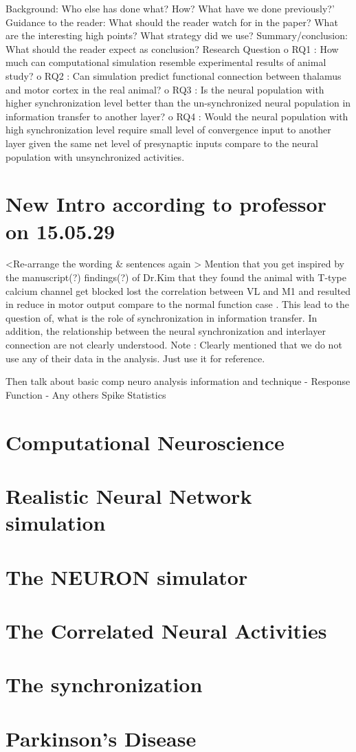 Background: Who else has done what? How? What have we done previously?’
Guidance to the reader: What should the reader watch for in the paper? What are the interesting high points? What strategy did we use?
Summary/conclusion: What should the reader expect as conclusion?
Research Question
o RQ1 : How much can computational simulation resemble experimental results of animal study?
o RQ2 : Can simulation predict functional connection between thalamus and motor cortex in the real animal?
o	RQ3 : Is the neural population with higher synchronization level better than the un-synchronized neural population in information transfer to another layer? 
o	RQ4 : Would the  neural population with high synchronization level  require small level of convergence input to another layer given the same net level of presynaptic inputs compare to the neural population with unsynchronized activities.

\section{New Intro according to professor on 15.05.29}
<Re-arrange the wording \& sentences again >
Mention that you get inspired by the manuscript(?) findings(?) of Dr.Kim that they found the animal with T-type calcium channel get blocked lost the correlation between VL and M1 and resulted in reduce in motor output
compare to the normal function case . This lead to the question of, what is the role of synchronization in information transfer.  In addition, the relationship between the neural synchronization and interlayer connection are not clearly understood. 
Note : Clearly mentioned that we do not use any of their data in the analysis. Just use it for reference. 

Then talk about basic comp neuro analysis information and technique 
- Response Function
- Any others  Spike Statistics 
\section{Computational Neuroscience}
\section{Realistic Neural Network simulation}

\section{The NEURON simulator}
\section{The Correlated Neural Activities}

\section{The synchronization}

\section{Parkinson's Disease}